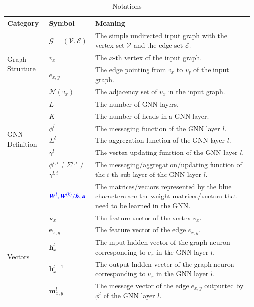 \begin{table}[h]
    \caption{Notations}
    \label{tab:notations}
    \centering
    \small
    \begin{tabular}{p{3em}lp{35em}}
        \toprule
       Category & Symbol & Meaning \\
        \midrule
        \multirow[c]{4}{3em}{Graph Structure}& $\mathcal{G}=(\mathcal{V}, \mathcal{E})$ & The simple undirected input graph with the vertex set $\mathcal{V}$ and the edge set $\mathcal{E}$. \\
        & $v_x$ & The $x$-th vertex of the input graph. \\
        & $e_{x,y}$ & The edge pointing from $v_x$ to $v_y$ of the input graph. \\
        & $\mathcal{N}(v_x)$ & The adjacency set of $v_x$ in the input graph. \\ \midrule
        \multirow[c]{6}{3em}{GNN Definition}& $L$ & The number of GNN layers. \\
        & $K$ & The number of heads in a GNN layer. \\
        & $\phi^l$ & The messaging function of the GNN layer $l$. \\
        & $\Sigma^l$ & The aggregation function of the GNN layer $l$. \\
        & $\gamma^l$ & The vertex updating function of the GNN layer $l$. \\ 
        & $\phi^{l,i}$ / $\Sigma^{l,i}$ / $\gamma^{l,i}$ & The messaging/aggregation/updating function of the $i$-th sub-layer of the GNN layer  $l$.\\
        & $\textcolor{blue}{\boldsymbol{W}^l, \boldsymbol{W}^{(k)}/\boldsymbol{b}, \boldsymbol{a}}$ & The matrices/vectors represented by the blue characters are the weight matrices/vectors that need to be learned in the GNN. \\  \midrule
        \multirow[c]{8}{3em}{Vectors}& $\boldsymbol{v}_x$ & The feature vector of the vertex $v_x$. \\
        & $\boldsymbol{e}_{x,y}$ & The feature vector of the edge $e_{x,y}$.  \\
        & $\boldsymbol{h}_x^{l}$ &  The {input} hidden vector of the graph neuron corresponding to $v_x$ in the GNN layer $l$. \\
        & $\boldsymbol{h}_x^{l+1}$ &  The {output} hidden vector of the graph neuron corresponding to $v_x$ in the GNN layer $l$.\\
        & $\boldsymbol{m}_{x,y}^l$ & The message vector of the edge $e_{x,y}$ outputted by $\phi^l$ of the GNN layer $l$. \\

\end{tabular}
\end{table}
